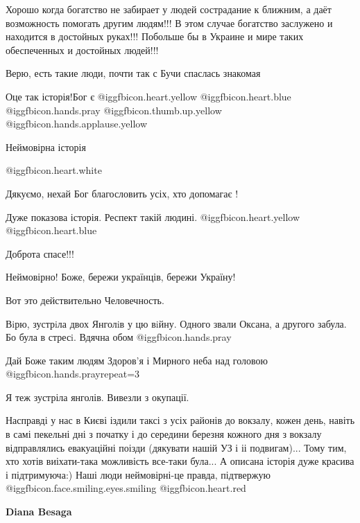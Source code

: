 \begin{itemize}

Хорошо когда богатство не забирает у людей сострадание к ближним, а даёт
возможность помогать другим людям!!! В этом случае богатство заслужено и
находится в достойных руках!!! Побольше бы в Украине и мире таких обеспеченных
и достойных людей!!!

Верю, есть такие люди, почти так с Бучи спаслась знакомая

Оце так історія!Бог є @igg{fbicon.heart.yellow}  @igg{fbicon.heart.blue}  @igg{fbicon.hands.pray}  @igg{fbicon.thumb.up.yellow}  @igg{fbicon.hands.applause.yellow} 

Неймовірна історія

 @igg{fbicon.heart.white} 

Дякуємо, нехай Бог благословить усіх, хто допомагає !

Дуже показова історія. Респект такій людині.  @igg{fbicon.heart.yellow}  @igg{fbicon.heart.blue} 

Доброта спасе!!!

Неймовірно! Боже, бережи українців, бережи Україну!

Вот это действительно Человечность.


Вiрю, зустрiла двох Янголiв у цю вiйну. Одного звали Оксана, а другого забула.
Бо була в стресi. Вдячна обом @igg{fbicon.hands.pray} 

Дай Боже таким людям Здоров'я і Мирного неба над головою  @igg{fbicon.hands.pray}{repeat=3} 

Я теж зустріла янголів. Вивезли з окупації.


Насправді у нас в Києві іздили таксі з усіх районів до вокзалу, кожен день,
навіть в самі пекельні дні з початку і до середини березня кожного дня з
вокзалу відправлялись евакуаційні поізди (дякувати нашій УЗ і іі подвигам)...
Тому тим, хто хотів виіхати-така можливість все-таки була... А описана історія
дуже красива і підтримуюча:) Наші люди неймовірні-це правда, підтвержую @igg{fbicon.face.smiling.eyes.smiling} @igg{fbicon.heart.red}

\begin{itemize} %
\textbf{Diana Besaga} 


\end{itemize}
\end{itemize}
